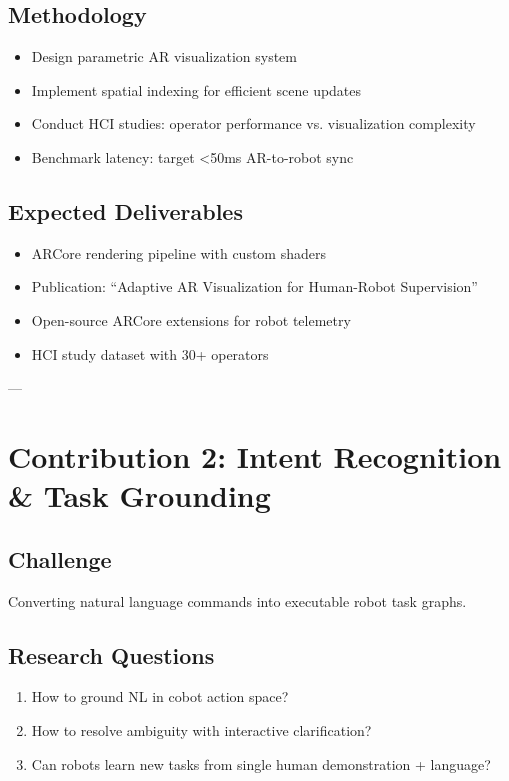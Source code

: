 \documentclass[12pt,a4paper,oneside]{book}
\begin{document}
\subsection{Methodology}
\begin{itemize}
    \item Design parametric AR visualization system
    \item Implement spatial indexing for efficient scene updates
    \item Conduct HCI studies: operator performance vs. visualization complexity
    \item Benchmark latency: target <50ms AR-to-robot sync
\end{itemize}

\subsection{Expected Deliverables}
\begin{tcolorbox}[colback=lightgreen, colframe=darkgreen]
\begin{itemize}
    \item ARCore rendering pipeline with custom shaders
    \item Publication: ``Adaptive AR Visualization for Human-Robot Supervision''
    \item Open-source ARCore extensions for robot telemetry
    \item HCI study dataset with 30+ operators
\end{itemize}
\end{tcolorbox}

---

\section{Contribution 2: Intent Recognition \& Task Grounding}

\subsection{Challenge}
Converting natural language commands into executable robot task graphs.

\subsection{Research Questions}
\begin{enumerate}
    \item How to ground NL in cobot action space?
    \item How to resolve ambiguity with interactive clarification?
    \item Can robots learn new tasks from single human demonstration + language?
\end{enumerate}
\end{document}
